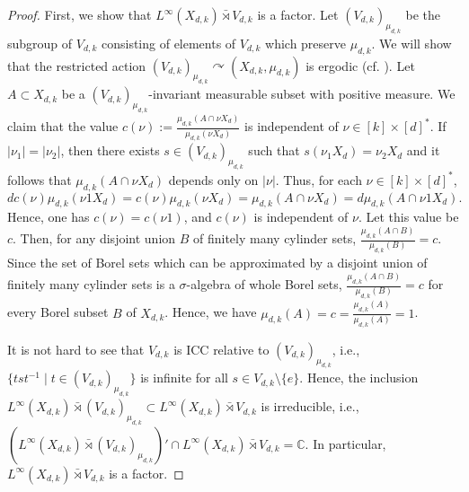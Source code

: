 \documentclass{amsart}
\theoremstyle{remark}
\theoremstyle{definition}
\begin{document}
\begin{proof}
First, we show that $L^{\infty}(X_{d, k}) \bar{\rtimes} V_{d, k}$ is a factor.
Let $(V_{d, k})_{\mu_{d, k}}$ be the subgroup of $V_{d, k}$ consisting of elements of $V_{d, k}$ which preserve $\mu_{d, k}$.
We will show that the restricted action $(V_{d, k})_{\mu_{d, k}} \curvearrowright (X_{d, k}, \mu_{d, k})$ is ergodic (cf. \cite{Jolissaint2}).
Let $A \subset X_{d, k}$ be a $(V_{d, k})_{\mu_{d, k}}$-invariant measurable subset with positive measure.
We claim that the value $\displaystyle c(\nu) := \frac{\mu_{d, k} (A \cap \nu X_d)}{\mu_{d, k} (\nu X_d)}$ is independent of $\nu \in [k] \times [d]^*$.
If $| \nu _1 | = | \nu _2|$, then there exists $s \in (V_{d, k})_{\mu_{d, k}}$ such that $s(\nu_1 X_d) = \nu_2 X_d$ and it follows that $\mu_{d, k} (A \cap \nu X_d)$ depends only on $| \nu |$.
Thus, for each $\nu \in [k] \times [d]^*$, 
\[
dc(\nu) \mu_{d, k} (\nu 1 X_d) = c(\nu) \mu_{d, k}(\nu X_d) = \mu_{d, k} (A \cap \nu X_d) = d \mu_{d, k} (A \cap \nu 1 X_d).
\]
Hence, one has $c(\nu) = c(\nu 1)$, and $c( \nu )$ is independent of $\nu$.
Let this value be $c$.
Then, for any disjoint union $B$ of finitely many cylinder sets, $\displaystyle \frac{\mu_{d, k}(A \cap B)}{\mu_{d, k} (B)} = c$.
Since the set of Borel sets which can be approximated by a disjoint union of finitely many cylinder sets is a $\sigma$-algebra of whole Borel sets, $\displaystyle \frac{\mu_{d, k}(A \cap B)}{\mu_{d, k} (B)} = c$ for every Borel subset $B$ of $X_{d, k}$.
Hence, we have $\displaystyle \mu _{d, k} (A) = c = \frac{\mu_{d, k} (A)}{\mu _{d, k} (A)} = 1$.

It is not hard to see that $V_{d, k}$ is ICC relative to $(V_{d, k})_{\mu_{d, k}}$, i.e., $\{ tst^{-1} \mid t \in (V_{d, k})_{\mu_{d, k}} \}$ is infinite for all $s \in V_{d, k} \setminus \{ e \}$.
Hence, the inclusion $L^{\infty}(X_{d, k}) \bar{\rtimes} (V_{d, k})_{\mu_{d, k}} \subset L^{\infty}(X_{d, k}) \bar{\rtimes} V_{d, k}$ is irreducible, i.e., $(L^{\infty}(X_{d, k}) \bar{\rtimes} (V_{d, k})_{\mu_{d, k}})' \cap L^{\infty}(X_{d, k}) \bar{\rtimes} V_{d, k} = \mathbb{C}$.
In particular, $L^{\infty}(X_{d, k}) \bar{\rtimes} V_{d, k}$ is a factor.


\end{proof}
\end{document}
